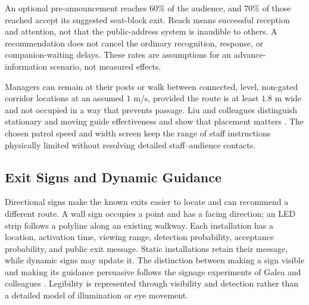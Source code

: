 \documentclass[11pt,a4paper]{article}
\begin{document}
An optional pre-announcement reaches $60\%$ of the audience, and $70\%$ of those reached accept its suggested seat-block exit. Reach means successful reception and attention, not that the public-address system is inaudible to others. A recommendation does not cancel the ordinary recognition, response, or companion-waiting delays. These rates are assumptions for an advance-information scenario, not measured effects.

Managers can remain at their posts or walk between connected, level, non-gated corridor locations at an assumed $1$ m/s, provided the route is at least $1.8$ m wide and not occupied in a way that prevents passage. Liu and colleagues distinguish stationary and moving guide effectiveness and show that placement matters \cite{liu}. The chosen patrol speed and width screen keep the range of staff instructions physically limited without resolving detailed staff--audience contacts.

\subsection{Exit Signs and Dynamic Guidance}

Directional signs make the known exits easier to locate and can recommend a different route. A wall sign occupies a point and has a facing direction; an LED strip follows a polyline along an existing walkway. Each installation has a location, activation time, viewing range, detection probability, acceptance probability, and public exit message. Static installations retain their message, while dynamic signs may update it. The distinction between making a sign visible and making its guidance persuasive follows the signage experiments of Galea and colleagues \cite{galea2014}. Legibility is represented through visibility and detection rather than a detailed model of illumination or eye movement.
\end{document}
